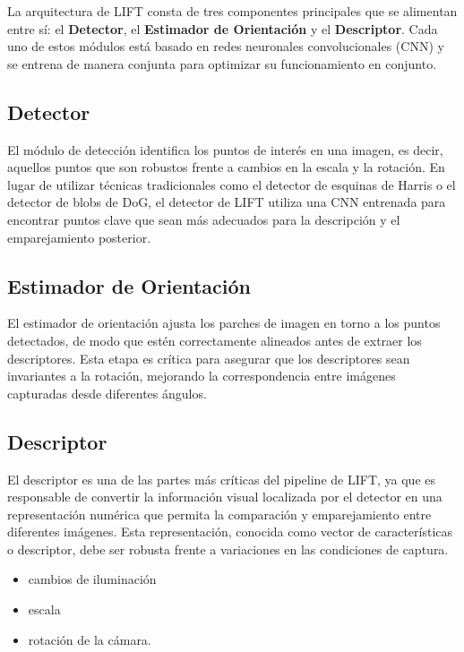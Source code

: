 \documentclass{article}
\begin{document}
La arquitectura de LIFT consta de tres componentes principales que se alimentan entre sí: el \textbf{Detector}, el \textbf{Estimador de Orientación} y el \textbf{Descriptor}. Cada uno de estos módulos está basado en redes neuronales convolucionales (CNN) y se entrena de manera conjunta para optimizar su funcionamiento en conjunto.

\subsection{Detector}

El módulo de detección identifica los puntos de interés en una imagen, es decir, aquellos puntos que son robustos frente a cambios en la escala y la rotación. En lugar de utilizar técnicas tradicionales como el detector de esquinas de Harris o el detector de blobs de DoG, el detector de LIFT utiliza una CNN entrenada para encontrar puntos clave que sean más adecuados para la descripción y el emparejamiento posterior.

\subsection{Estimador de Orientación}

El estimador de orientación ajusta los parches de imagen en torno a los puntos detectados, de modo que estén correctamente alineados antes de extraer los descriptores. Esta etapa es crítica para asegurar que los descriptores sean invariantes a la rotación, mejorando la correspondencia entre imágenes capturadas desde diferentes ángulos.

\subsection{Descriptor}

El descriptor es una de las partes más críticas del pipeline de LIFT, ya que es responsable de convertir la información visual localizada por el detector en una representación numérica que permita la comparación y emparejamiento entre diferentes imágenes. Esta representación, conocida como vector de características o descriptor, debe ser robusta frente a variaciones en las condiciones de captura.

\begin{itemize}
  \item cambios de iluminación
  \item escala
  \item rotación de la cámara.
\end{itemize}
\end{document}
